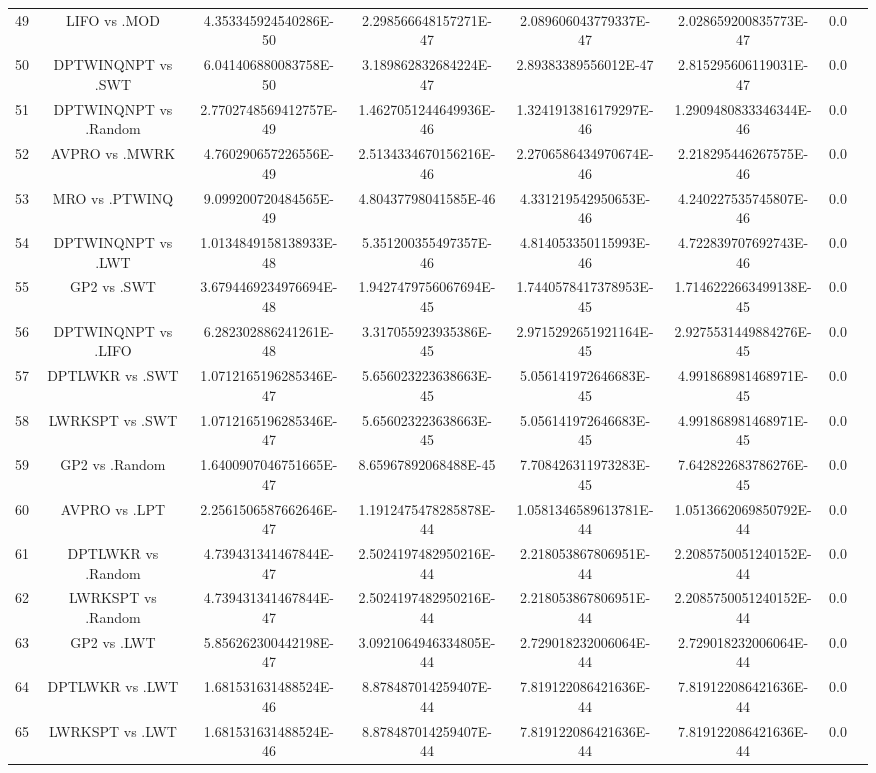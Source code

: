 \documentclass[a3paper,10pt]{article}
\begin{document}
\begin{table}[!htp]
\begin{tabular}{cccccccc}
49&LIFO vs .MOD&4.353345924540286E-50&2.298566648157271E-47&2.089606043779337E-47&2.028659200835773E-47&0.0\\
50&DPTWINQNPT vs .SWT&6.041406880083758E-50&3.189862832684224E-47&2.89383389556012E-47&2.815295606119031E-47&0.0\\
51&DPTWINQNPT vs .Random&2.7702748569412757E-49&1.4627051244649936E-46&1.3241913816179297E-46&1.2909480833346344E-46&0.0\\
52&AVPRO vs .MWRK&4.760290657226556E-49&2.5134334670156216E-46&2.2706586434970674E-46&2.218295446267575E-46&0.0\\
53&MRO vs .PTWINQ&9.099200720484565E-49&4.80437798041585E-46&4.331219542950653E-46&4.240227535745807E-46&0.0\\
54&DPTWINQNPT vs .LWT&1.0134849158138933E-48&5.351200355497357E-46&4.814053350115993E-46&4.722839707692743E-46&0.0\\
55&GP2 vs .SWT&3.6794469234976694E-48&1.9427479756067694E-45&1.7440578417378953E-45&1.7146222663499138E-45&0.0\\
56&DPTWINQNPT vs .LIFO&6.282302886241261E-48&3.317055923935386E-45&2.9715292651921164E-45&2.9275531449884276E-45&0.0\\
57&DPTLWKR vs .SWT&1.0712165196285346E-47&5.656023223638663E-45&5.056141972646683E-45&4.991868981468971E-45&0.0\\
58&LWRKSPT vs .SWT&1.0712165196285346E-47&5.656023223638663E-45&5.056141972646683E-45&4.991868981468971E-45&0.0\\
59&GP2 vs .Random&1.6400907046751665E-47&8.65967892068488E-45&7.708426311973283E-45&7.642822683786276E-45&0.0\\
60&AVPRO vs .LPT&2.2561506587662646E-47&1.1912475478285878E-44&1.0581346589613781E-44&1.0513662069850792E-44&0.0\\
61&DPTLWKR vs .Random&4.739431341467844E-47&2.5024197482950216E-44&2.218053867806951E-44&2.2085750051240152E-44&0.0\\
62&LWRKSPT vs .Random&4.739431341467844E-47&2.5024197482950216E-44&2.218053867806951E-44&2.2085750051240152E-44&0.0\\
63&GP2 vs .LWT&5.856262300442198E-47&3.0921064946334805E-44&2.729018232006064E-44&2.729018232006064E-44&0.0\\
64&DPTLWKR vs .LWT&1.681531631488524E-46&8.878487014259407E-44&7.819122086421636E-44&7.819122086421636E-44&0.0\\
65&LWRKSPT vs .LWT&1.681531631488524E-46&8.878487014259407E-44&7.819122086421636E-44&7.819122086421636E-44&0.0\\

\end{tabular}
\end{table}
\end{document}
